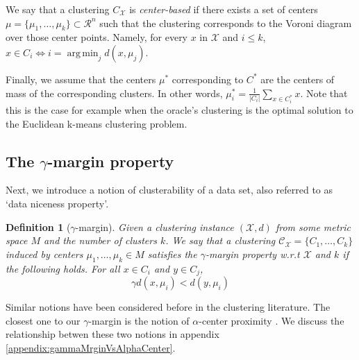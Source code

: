 \documentclass{article}
\newcommand{\mc}{\mathcal}
\DeclareMathOperator*{\argmin}{arg\,min}
\newtheorem{definition}[theorem]{Definition}
\begin{document}
We say that a clustering $C_{\mc X}$ is \emph{center-based} if there exists a set of centers $\mc \mu = \{\mu_1, \ldots, \mu_k\} \subset \mc R^n$ such that the clustering corresponds to the Voroni diagram over those center points. Namely, for every $x$ in $\mc X$ and $i \leq k$,  $x\in C_i \Leftrightarrow i=\argmin_j d(x,\mu_j)$. 







Finally, we assume that the centers $\mu^*$ corresponding to $C^*$ are the centers of mass of the corresponding clusters. In other words, $\mu^*_i=\frac{1}{|C_i|}\sum_{x\in C^*_i} x$. Note that this is the case for example when the oracle's clustering is the optimal solution to the Euclidean k-means clustering problem.

\subsection{The $\gamma$-margin property}
Next, we introduce a notion of clusterability of a data set, also referred to as `data niceness property'.

\begin{definition}[$\gamma$-margin]
\label{defn:alphacp}
Given a clustering instance $(\mc X, d)$ from some metric space $M$ and the number of clusters $k$. We say that a clustering $\mc C_{\mc X} = \{C_1, \ldots, C_k\}$ induced by centers $\mu_1, \ldots, \mu_k \in M$ satisfies the $\gamma$-margin property w.r.t $\mc X$ and $k$ if the following holds. For all $x \in C_i$ and $y \in C_j$, 
$$\gamma d(x, \mu_i) < d(y, \mu_i)$$
\end{definition}

Similar notions have been considered before in the clustering literature. The closest one to our $\gamma$-margin is the notion of $\alpha$-center proximity \cite{balcan2012clustering,awasthi2012center}. We discuss the relationship betwen these two notions in appendix \ref{appendix:gammaMrginVsAlphaCenter}. 
\end{document}
